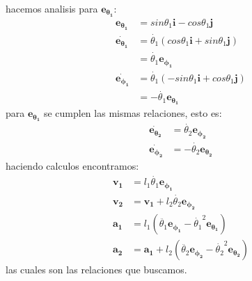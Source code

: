 \documentclass{article}
\begin{document}
\begin{tcolorbox}
hacemos analisis para $\bm{e_{\theta_1}}$:
\begin{align*}
    \bm{e_{\theta_1}} 
    &= sin\theta_1 \bm{i} - cos\theta_1 \bm{j} \\
    \bm{\dot{e_{\theta_1}}} 
    &= \dot{\theta_1} (cos\theta_1 \bm{i} + sin\theta_1 \bm{j})\\
    &= \dot{\theta_1} \bm{e_{\phi_1}} \\
    \bm{\dot{e_{\phi_1}}}
    &= \dot{\theta_1} (-sin\theta_1 \bm{i} + cos\theta_1 \bm{j}) \\
    &= -\dot{\theta_1} \bm{e_{\theta_1}} 
\end{align*}
para $\bm{e_{\theta_1}}$ se cumplen las mismas relaciones, esto es:
\begin{align*}
    \bm{\dot{e_{\theta_2}}} 
    &= \dot{\theta_2} \bm{e_{\phi_2}} \\
    \bm{\dot{e_{\phi_2}}}
    &= -\dot{\theta_2}\bm{e_{\theta_2}}
\end{align*}
haciendo calculos encontramos:
\begin{align*}
    \bm{v_1} 
    &= l_1\dot{\theta_1}\bm{e_{\phi_1}} \\
    \bm{v_2} 
    &= \bm{v_1} + l_2\dot{\theta_2}\bm{e_{\phi_2}} \\
    \bm{a_1}
    &= l_1(\ddot{\theta_1}\bm{e_{\phi_1}} - \dot{\theta_1}^2\bm{e_{\theta_1}}) \\
    \bm{a_2}
    &= \bm{a_1} + l_2(\ddot{\theta_2}\bm{e_{\phi_2}} - \dot{\theta_2}^2\bm{e_{\theta_2}})
\end{align*}
las cuales son las relaciones que buscamos.
\end{tcolorbox}
\end{document}
